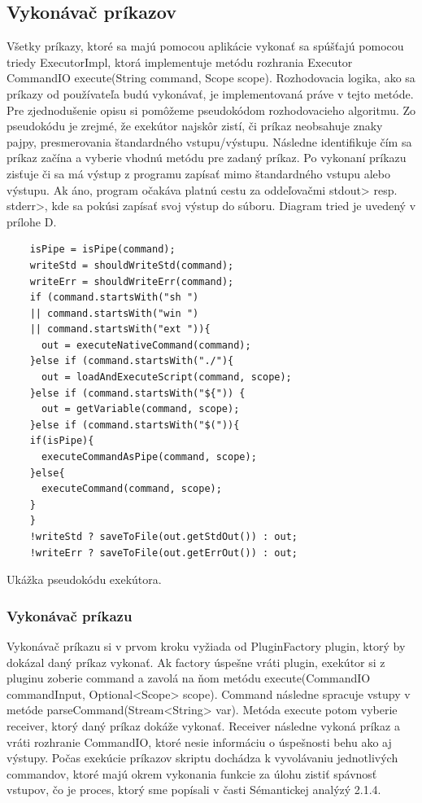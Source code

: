 {\subsection{Vykonávač príkazov}
\indent Všetky príkazy, ktoré sa majú pomocou aplikácie vykonať sa spúšťajú pomocou triedy ExecutorImpl, ktorá implementuje metódu rozhrania Executor CommandIO execute(String command, Scope scope). Rozhodovacia logika, ako sa príkazy od používateľa budú vykonávať, je implementovaná práve v tejto metóde. Pre zjednodušenie opisu si pomôžeme pseudokódom rozhodovacieho algoritmu. Zo pseudokódu je zrejmé, že exekútor najskôr zistí, či príkaz neobsahuje znaky pajpy, presmerovania štandardného vstupu/výstupu. Následne identifikuje čím sa príkaz začína a vyberie vhodnú metódu pre zadaný príkaz. Po vykonaní príkazu zisťuje či sa má výstup z programu zapísať mimo štandardného vstupu alebo výstupu. Ak áno, program očakáva platnú cestu za oddeľovačmi stdout> \acrshort{resp.} stderr>, kde sa pokúsi zapísať svoj výstup do súboru. Diagram tried je uvedený v prílohe D.
\begin{algorithm}[H]
	\begin{verbatim}
	isPipe = isPipe(command);
	writeStd = shouldWriteStd(command);
	writeErr = shouldWriteErr(command);
	if (command.startsWith("sh ") 
	|| command.startsWith("win ") 
	|| command.startsWith("ext ")){
	  out = executeNativeCommand(command);
	}else if (command.startsWith("./"){
	  out = loadAndExecuteScript(command, scope);
	}else if (command.startsWith("${")) {
	  out = getVariable(command, scope);
	}else if (command.startsWith("$(")){
	if(isPipe){
	  executeCommandAsPipe(command, scope);
	}else{
	  executeCommand(command, scope);
	}
	}
	!writeStd ? saveToFile(out.getStdOut()) : out;
	!writeErr ? saveToFile(out.getErrOut()) : out;
	\end{verbatim}
	\caption{Ukážka pseudokódu exekútora. }
	\label{alg:gen}
\end{algorithm}
\subsubsection{Vykonávač príkazu}
\indent Vykonávač príkazu si v prvom kroku vyžiada od PluginFactory plugin, ktorý by dokázal daný príkaz vykonať. Ak factory úspešne vráti plugin, exekútor si z pluginu zoberie command a zavolá na ňom metódu execute(CommandIO commandInput, Optional<Scope> scope{)}. Command následne spracuje vstupy v metóde \newline parseCommand{(}Stream<String> var). Metóda execute potom vyberie receiver, ktorý daný príkaz dokáže vykonať. Receiver následne vykoná príkaz a vráti rozhranie CommandIO, ktoré nesie informáciu o úspešnosti behu ako aj výstupy. Počas exekúcie príkazov skriptu dochádza k vyvolávaniu jednotlivých commandov, ktoré majú okrem vykonania funkcie za úlohu zistiť spávnosť vstupov, čo je proces, ktorý sme popísali v časti Sémantickej analýzý 2.1.4.

}
